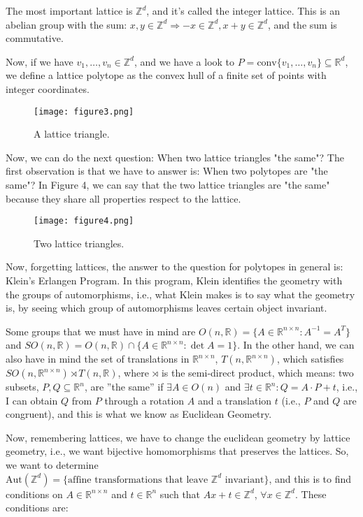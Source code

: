 The most important lattice is $\mathbb{Z}^{d}$, and it's called the
integer lattice. This is an abelian group with the sum: $x, y \in
\mathbb{Z}^{d} \Rightarrow - x \in \mathbb{Z}^{d}, x + y \in
\mathbb{Z}^{d}$, and the sum is commutative.

Now, if we have $v_{1}, \ldots, v_{n} \in \mathbb{Z}^{d}$, and we have
a look to $P = \text{conv}\lbrace v_{1}, \ldots, v_{n} \rbrace
\subseteq \mathbb{R}^{d}$, we define a lattice polytope as the convex
hull of a finite set of points with integer coordinates.

\begin{figure}
\centering
\texttt{[image: figure3.png]}
\caption{A lattice triangle.}
\end{figure}

Now, we can do the next question: When two lattice triangles "the
same"? The first observation is that we have to answer is: When two
polytopes are "the same"? In Figure 4, we can say that the two lattice
triangles are "the same" because they share all properties respect to
the lattice.

\begin{figure}
\centering
\texttt{[image: figure4.png]}
\caption{Two lattice triangles.}
\end{figure}

Now, forgetting lattices, the answer to the question for polytopes in
general is: Klein's Erlangen Program. In this program, Klein
identifies the geometry with the groups of automorphisms, i.e., what
Klein makes is to say what the geometry is, by seeing which group of
automorphisms leaves certain object invariant.

Some groups that we must have in mind are $O(n, \mathbb{R}) = \lbrace
A \in \mathbb{R}^{n \times n} : A^{-1} = A^{T} \rbrace$ and $SO(n,
\mathbb{R}) = O(n, \mathbb{R}) \cap \lbrace A \in \mathbb{R}^{n \times
  n} : \det A = 1 \rbrace$. In the other hand, we can also have in
mind the set of translations in $\mathbb{R}^{n \times n}$, $T(n,
\mathbb{R}^{n \times n})$, which satisfies $SO(n, \mathbb{R}^{n \times
  n}) \rtimes T(n, \mathbb{R})$, where $\rtimes$ is the semi-direct
product, which means: two subsets, $P, Q \subseteq \mathbb{R}^{n}$,
are ''the same'' if $\exists A \in O(n)$ and $\exists t \in
\mathbb{R}^{n} : Q = A \cdot P + t$, i.e., I can obtain $Q$ from $P$
through a rotation $A$ and a translation $t$ (i.e., $P$ and $Q$ are
congruent), and this is what we know as Euclidean Geometry.

Now, remembering lattices, we have to change the euclidean geometry by
lattice geometry, i.e., we want bijective homomorphisms that preserves
the lattices. So, we want to determine $\text{Aut}(\mathbb{Z}^{d}) =
\lbrace \text{affine transformations that leave } \mathbb{Z}^{d}
\text{ invariant} \rbrace$, and this is to find conditions on $A \in
\mathbb{R}^{n \times n}$ and $t \in \mathbb{R}^{n}$ such that $Ax + t
\in \mathbb{Z}^{d}$, $\forall x \in \mathbb{Z}^{d}$.
These conditions are:

